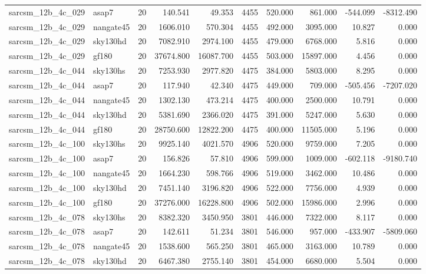 \documentclass{article}
\begin{document}
\begin{longtable}{llrrrrrrrr}
sarcsm\_12b\_4c\_029 & asap7 & 20 & 140.541 & 49.353 & 4455 & 520.000 & 861.000 & -544.099 & -8312.490 \\
sarcsm\_12b\_4c\_029 & nangate45 & 20 & 1606.010 & 570.304 & 4455 & 492.000 & 3095.000 & 10.827 & 0.000 \\
sarcsm\_12b\_4c\_029 & sky130hd & 20 & 7082.910 & 2974.100 & 4455 & 479.000 & 6768.000 & 5.816 & 0.000 \\
sarcsm\_12b\_4c\_029 & gf180 & 20 & 37674.800 & 16087.700 & 4455 & 503.000 & 15897.000 & 4.456 & 0.000 \\
sarcsm\_12b\_4c\_044 & sky130hs & 20 & 7253.930 & 2977.820 & 4475 & 384.000 & 5803.000 & 8.295 & 0.000 \\
sarcsm\_12b\_4c\_044 & asap7 & 20 & 117.940 & 42.340 & 4475 & 449.000 & 709.000 & -505.456 & -7207.020 \\
sarcsm\_12b\_4c\_044 & nangate45 & 20 & 1302.130 & 473.214 & 4475 & 400.000 & 2500.000 & 10.791 & 0.000 \\
sarcsm\_12b\_4c\_044 & sky130hd & 20 & 5381.690 & 2366.020 & 4475 & 391.000 & 5247.000 & 5.630 & 0.000 \\
sarcsm\_12b\_4c\_044 & gf180 & 20 & 28750.600 & 12822.200 & 4475 & 400.000 & 11505.000 & 5.196 & 0.000 \\
sarcsm\_12b\_4c\_100 & sky130hs & 20 & 9925.140 & 4021.570 & 4906 & 520.000 & 9759.000 & 7.205 & 0.000 \\
sarcsm\_12b\_4c\_100 & asap7 & 20 & 156.826 & 57.810 & 4906 & 599.000 & 1009.000 & -602.118 & -9180.740 \\
sarcsm\_12b\_4c\_100 & nangate45 & 20 & 1664.230 & 598.766 & 4906 & 519.000 & 3462.000 & 10.486 & 0.000 \\
sarcsm\_12b\_4c\_100 & sky130hd & 20 & 7451.140 & 3196.820 & 4906 & 522.000 & 7756.000 & 4.939 & 0.000 \\
sarcsm\_12b\_4c\_100 & gf180 & 20 & 37276.000 & 16228.800 & 4906 & 502.000 & 15986.000 & 2.996 & 0.000 \\
sarcsm\_12b\_4c\_078 & sky130hs & 20 & 8382.320 & 3450.950 & 3801 & 446.000 & 7322.000 & 8.117 & 0.000 \\
sarcsm\_12b\_4c\_078 & asap7 & 20 & 142.611 & 51.234 & 3801 & 546.000 & 957.000 & -433.907 & -5809.060 \\
sarcsm\_12b\_4c\_078 & nangate45 & 20 & 1538.600 & 565.250 & 3801 & 465.000 & 3163.000 & 10.789 & 0.000 \\
sarcsm\_12b\_4c\_078 & sky130hd & 20 & 6467.380 & 2755.140 & 3801 & 454.000 & 6680.000 & 5.504 & 0.000 \\

\end{longtable}
\end{document}
